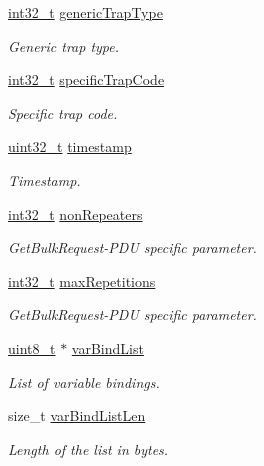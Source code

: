 \begin{DoxyCompactItemize}
\hyperlink{stdint_8h_ab1967d8591af1a4e48c37fd2b0f184d0}{int32\+\_\+t} \hyperlink{structSnmpMessage_abef516557dd784fbaffa335e9e63353c}{generic\+Trap\+Type}
\begin{DoxyCompactList}\small\item\em Generic trap type. \end{DoxyCompactList}\item 
\hyperlink{stdint_8h_ab1967d8591af1a4e48c37fd2b0f184d0}{int32\+\_\+t} \hyperlink{structSnmpMessage_aca9391c4afa530ea6d4a12d48b8b424a}{specific\+Trap\+Code}
\begin{DoxyCompactList}\small\item\em Specific trap code. \end{DoxyCompactList}\item 
\hyperlink{stdint_8h_a435d1572bf3f880d55459d9805097f62}{uint32\+\_\+t} \hyperlink{structSnmpMessage_afbc78f992a1722fce0dbeb050600d070}{timestamp}
\begin{DoxyCompactList}\small\item\em Timestamp. \end{DoxyCompactList}\item 
\hyperlink{stdint_8h_ab1967d8591af1a4e48c37fd2b0f184d0}{int32\+\_\+t} \hyperlink{structSnmpMessage_a636216d602b0d25cd83d25b42f828105}{non\+Repeaters}
\begin{DoxyCompactList}\small\item\em Get\+Bulk\+Request-\/\+P\+DU specific parameter. \end{DoxyCompactList}\item 
\hyperlink{stdint_8h_ab1967d8591af1a4e48c37fd2b0f184d0}{int32\+\_\+t} \hyperlink{structSnmpMessage_afa0f8f0e8eb0a126a401704cef25d3d3}{max\+Repetitions}
\begin{DoxyCompactList}\small\item\em Get\+Bulk\+Request-\/\+P\+DU specific parameter. \end{DoxyCompactList}\item 
\hyperlink{stdint_8h_aba7bc1797add20fe3efdf37ced1182c5}{uint8\+\_\+t} $\ast$ \hyperlink{structSnmpMessage_a8c51e21ca5943c3dceaa76b267539bfb}{var\+Bind\+List}
\begin{DoxyCompactList}\small\item\em List of variable bindings. \end{DoxyCompactList}\item 
size\+\_\+t \hyperlink{structSnmpMessage_a877d26bc0ae8ef5c78ac645a2ba112ea}{var\+Bind\+List\+Len}
\begin{DoxyCompactList}\small\item\em Length of the list in bytes. \end{DoxyCompactList}\item 

\end{DoxyCompactItemize}
